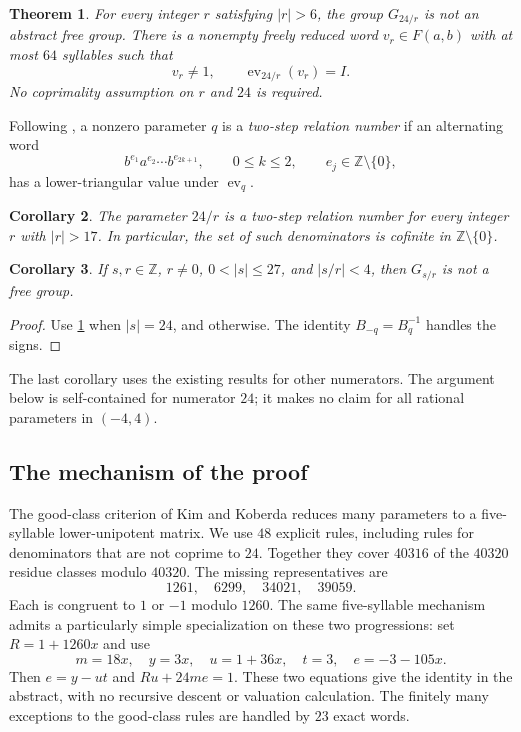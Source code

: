 \documentclass[11pt]{article}
\newtheorem{theorem}{Theorem}[section]
\newtheorem{corollary}[theorem]{Corollary}
\theoremstyle{definition}
\theoremstyle{remark}
\numberwithin{equation}{section}
\newcommand{\Z}{\mathbb Z}
\newcommand{\F}{F(a,b)}
\newcommand{\ev}{\operatorname{ev}}
\begin{document}
\begin{theorem}\label{thm:main}
For every integer $r$ satisfying $|r|>6$, the group $G_{24/r}$ is not
an abstract free group. There is a nonempty freely reduced word
$v_r\in\F$ with at most $64$ syllables such that
\[
 v_r\ne1,\qquad \ev_{24/r}(v_r)=I.
\]
No coprimality assumption on $r$ and $24$ is required.
\end{theorem}

Following \cite[Definition in Section~1]{KK2020}, a nonzero parameter
$q$ is a \emph{two-step relation number} if an alternating word
\begin{equation}\label{eq:twostep-def}
 b^{e_1}a^{e_2}\cdots b^{e_{2k+1}},\qquad
 0\leq k\leq2,\qquad e_j\in\Z\setminus\{0\},
\end{equation}
has a lower-triangular value under $\ev_q$.

\begin{corollary}\label{cor:twostep}
The parameter $24/r$ is a two-step relation number for every integer
$r$ with $|r|>17$. In particular, the set of such denominators is
cofinite in $\Z\setminus\{0\}$.
\end{corollary}

\begin{corollary}\label{cor:smallnumerators}
If $s,r\in\Z$, $r\ne0$, $0<|s|\leq27$, and $|s/r|<4$, then
$G_{s/r}$ is not a free group.
\end{corollary}
\begin{proof}
Use \cref{thm:main} when $|s|=24$, and
\cite[Theorem~1.4(1)]{KK2020} otherwise. The identity
$B_{-q}=B_q^{-1}$ handles the signs.
\end{proof}
The last corollary uses the existing results for other numerators.
The argument below is self-contained for numerator $24$; it makes no
claim for all rational parameters in $(-4,4)$.

\subsection*{The mechanism of the proof}
The good-class criterion of Kim and Koberda reduces many parameters
to a five-syllable lower-unipotent matrix. We use $48$ explicit rules,
including rules for denominators that are not coprime to $24$.
Together they cover $40316$ of the $40320$ residue classes modulo
$40320$. The missing representatives are
\begin{equation}\label{eq:omitted}
 1261,\quad6299,\quad34021,\quad39059.
\end{equation}
Each is congruent to $1$ or $-1$ modulo $1260$. The same
five-syllable mechanism admits a particularly simple specialization
on these two progressions: set $R=1+1260x$ and use
\[
 m=18x,\quad y=3x,\quad u=1+36x,\quad t=3,\quad e=-3-105x.
\]
Then $e=y-ut$ and $Ru+24me=1$. These two equations give the
identity in the abstract, with no recursive descent or valuation
calculation. The finitely many exceptions to the good-class rules
are handled by $23$ exact words.
\end{document}
